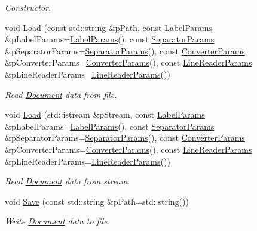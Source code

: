\begin{DoxyCompactItemize}
\begin{DoxyCompactList}\small\item\em Constructor. \end{DoxyCompactList}\item 
void \hyperlink{classrapidcsv_1_1Document_a7036c131dbfe536760bc715052b8e6f6}{Load} (const std\+::string \&p\+Path, const \hyperlink{structrapidcsv_1_1LabelParams}{Label\+Params} \&p\+Label\+Params=\hyperlink{structrapidcsv_1_1LabelParams}{Label\+Params}(), const \hyperlink{structrapidcsv_1_1SeparatorParams}{Separator\+Params} \&p\+Separator\+Params=\hyperlink{structrapidcsv_1_1SeparatorParams}{Separator\+Params}(), const \hyperlink{structrapidcsv_1_1ConverterParams}{Converter\+Params} \&p\+Converter\+Params=\hyperlink{structrapidcsv_1_1ConverterParams}{Converter\+Params}(), const \hyperlink{structrapidcsv_1_1LineReaderParams}{Line\+Reader\+Params} \&p\+Line\+Reader\+Params=\hyperlink{structrapidcsv_1_1LineReaderParams}{Line\+Reader\+Params}())
\begin{DoxyCompactList}\small\item\em Read \hyperlink{classrapidcsv_1_1Document}{Document} data from file. \end{DoxyCompactList}\item 
void \hyperlink{classrapidcsv_1_1Document_ac8f256b27db75652d6539bb6f23cdc23}{Load} (std\+::istream \&p\+Stream, const \hyperlink{structrapidcsv_1_1LabelParams}{Label\+Params} \&p\+Label\+Params=\hyperlink{structrapidcsv_1_1LabelParams}{Label\+Params}(), const \hyperlink{structrapidcsv_1_1SeparatorParams}{Separator\+Params} \&p\+Separator\+Params=\hyperlink{structrapidcsv_1_1SeparatorParams}{Separator\+Params}(), const \hyperlink{structrapidcsv_1_1ConverterParams}{Converter\+Params} \&p\+Converter\+Params=\hyperlink{structrapidcsv_1_1ConverterParams}{Converter\+Params}(), const \hyperlink{structrapidcsv_1_1LineReaderParams}{Line\+Reader\+Params} \&p\+Line\+Reader\+Params=\hyperlink{structrapidcsv_1_1LineReaderParams}{Line\+Reader\+Params}())
\begin{DoxyCompactList}\small\item\em Read \hyperlink{classrapidcsv_1_1Document}{Document} data from stream. \end{DoxyCompactList}\item 
void \hyperlink{classrapidcsv_1_1Document_a9a20f5cb294ac8e28d312dc3665957fe}{Save} (const std\+::string \&p\+Path=std\+::string())
\begin{DoxyCompactList}\small\item\em Write \hyperlink{classrapidcsv_1_1Document}{Document} data to file. \end{DoxyCompactList}\item 

\end{DoxyCompactItemize}
